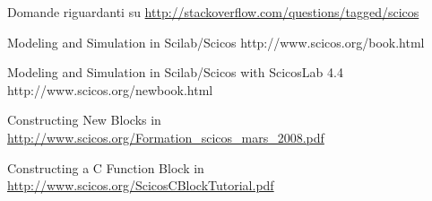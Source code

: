 \begin{thebibliography}{99}
    Domande riguardanti \SciCos{} su 
        \url{http://stackoverflow.com/questions/tagged/scicos}

        {Modeling and Simulation in Scilab/Scicos}
        {http://www.scicos.org/book.html}

        {Modeling and Simulation in Scilab/Scicos with ScicosLab 4.4}
        {http://www.scicos.org/newbook.html}

    Constructing New Blocks in \SciCos{}
    \url{http://www.scicos.org/Formation_scicos_mars_2008.pdf}

    Constructing a C Function Block in \SciCos{}
    \url{http://www.scicos.org/ScicosCBlockTutorial.pdf}

\end{thebibliography}
